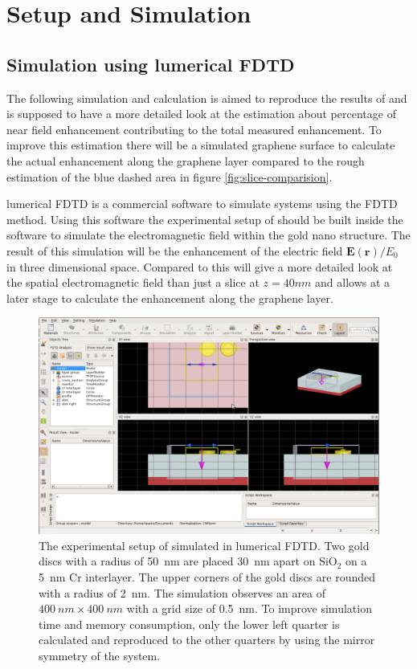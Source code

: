 \newpage
\section{Setup and Simulation}
\subsection{Simulation using lumerical FDTD}

The following simulation and calculation is aimed to reproduce the results of \cite{heeg} and is supposed to have a more detailed look at the estimation about percentage of near field enhancement contributing to the total measured enhancement. To improve this estimation there will be a simulated graphene surface to calculate the actual enhancement along the graphene layer compared to the rough estimation of the blue dashed area in figure \ref{fig:slice-comparision}.

lumerical FDTD is a commercial software to simulate systems using the FDTD method. Using this software the experimental setup of \cite{heeg} should be built inside the software to simulate the electromagnetic field within the gold nano structure. The result of this simulation will be the enhancement of the electric field $\mathbf{E}(\mathbf{r})/E_0$ in three dimensional space. Compared to \cite{heeg} this will give a more detailed look at the spatial electromagnetic field than just a slice at $z=40nm$ and allows at a later stage to calculate the enhancement along the graphene layer.

\begin{figure}[!h]
  \includegraphics[width=\textwidth]{./images/lumerical.png}
  \caption{The experimental setup of \cite{heeg} simulated in lumerical FDTD. Two gold discs with a radius of \SI{50}{nm} are placed \SI{30}{nm} apart on SiO$_2$ on a \SI{5}{nm} Cr interlayer. The upper corners of the gold discs are rounded with a radius of \SI{2}{nm}. The simulation observes an area of $\SI{400}{nm}\times\SI{400}{nm}$ with a grid size of \SI{0.5}{nm}. To improve simulation time and memory consumption, only the lower left quarter is calculated and reproduced to the other quarters by using the mirror symmetry of the system.}
  \label{fig:lumerical}
\end{figure}

